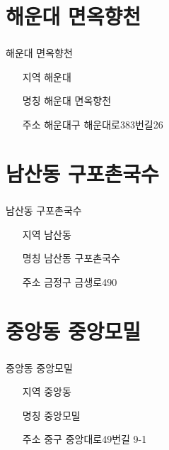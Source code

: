 \documentclass[aspectratio=1610,17pt,xcolor=pdftex,dvipsnames,table,handout]{beamer}
\begin{document}
		\section{ 해운대 면옥향천	}
		\begin{frame} [t,plain]
		\frametitle{ }
			\begin{block} {	해운대 면옥향천	}
			\setlength{\leftmargini}{4em}			
			\begin{itemize}
				\item [지역] 해운대	
				\item [명칭] 해운대 면옥향천	
				\item [주소] 해운대구 해운대로383번길26
			\end{itemize}
			\end{block}						
		\end{frame}						

		\section{ 남산동 구포촌국수	}
		\begin{frame} [t,plain]
		\frametitle{ }
			\begin{block} {	남산동 구포촌국수	}
			\setlength{\leftmargini}{4em}			
			\begin{itemize}
				\item [지역] 남산동	
				\item [명칭] 남산동 구포촌국수	
				\item [주소] 금정구 금생로490
			\end{itemize}
			\end{block}						
		\end{frame}						


		\section{ 중앙동 중앙모밀	}
		\begin{frame} [t,plain]
		\frametitle{ }
			\begin{block} {	중앙동 중앙모밀	}
			\setlength{\leftmargini}{4em}			
			\begin{itemize}
				\item [지역] 중앙동	
				\item [명칭] 중앙모밀	
				\item [주소] 중구 중앙대로49번길 9-1
			\end{itemize}
			\end{block}						
		\end{frame}						
\end{document}
